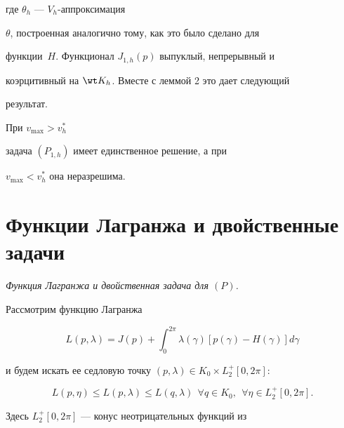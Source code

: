 где $\theta_{h}$ --- $V_h$-аппроксимация


$\theta$, построенная аналогично тому, как это было сделано для


функции~$H$. Функционал $J_{1,h}(p)$ выпуклый, непрерывный и


коэрцитивный на $\wt K_h$. Вместе с леммой 2 это дает следующий


результат.





\begin{thm}


При $v_{\max}>v_h^{*}$


задача $(P_{1,h})$ имеет единственное решение, а при


$v_{\max}<v_h^{*}$ она неразрешима.


\end{thm}








\section{Функции Лагранжа и двойственные задачи}





{\it Функция Лагранжа и двойственная задача для $(P)$.}


Рассмотрим функцию Лагранжа


\begin{equation}\label {lagrange}


L(p,\lambda)= J(p) + \int_{0}^{2\pi} \lambda(\gamma)[p(\gamma)-H(\gamma)]


d\gamma


\end{equation}


и будем искать ее седловую точку $(p,\lambda) \in


K_{0}\times L_{2}^{+}[0,2\pi]$:


\begin{equation}\label {saddle0}


L(p,\eta)\leq L(p,\lambda)\leq L(q,\lambda) \ \ \forall


q \in K_{0}, \ \ \forall \eta \in L_{2}^{+}[0,2\pi].


\end{equation}


Здесь $L_{2}^{+}[0,2\pi]$ --- конус неотрицательных функций из


